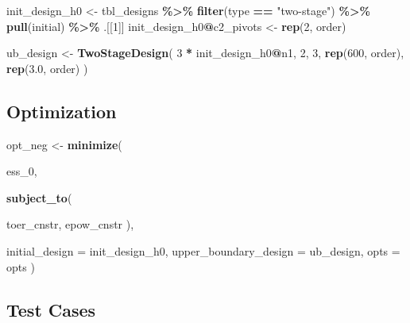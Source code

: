 \documentclass[
]{book}
\newenvironment{Shaded}{\begin{snugshade}}{\end{snugshade}}
\newcommand{\DataTypeTok}[1]{\textcolor[rgb]{0.13,0.29,0.53}{#1}}
\newcommand{\DecValTok}[1]{\textcolor[rgb]{0.00,0.00,0.81}{#1}}
\newcommand{\FloatTok}[1]{\textcolor[rgb]{0.00,0.00,0.81}{#1}}
\newcommand{\KeywordTok}[1]{\textcolor[rgb]{0.13,0.29,0.53}{\textbf{#1}}}
\newcommand{\NormalTok}[1]{#1}
\newcommand{\OperatorTok}[1]{\textcolor[rgb]{0.81,0.36,0.00}{\textbf{#1}}}
\newcommand{\StringTok}[1]{\textcolor[rgb]{0.31,0.60,0.02}{#1}}
\begin{document}
\begin{Shaded}
\begin{Highlighting}[]
\NormalTok{init\_design\_h0 \textless{}{-}}\StringTok{ }\NormalTok{tbl\_designs }\OperatorTok{\%\textgreater{}\%}\StringTok{ }
\StringTok{    }\KeywordTok{filter}\NormalTok{(type }\OperatorTok{==}\StringTok{ "two{-}stage"}\NormalTok{) }\OperatorTok{\%\textgreater{}\%}\StringTok{ }
\StringTok{    }\KeywordTok{pull}\NormalTok{(initial) }\OperatorTok{\%\textgreater{}\%}\StringTok{ }
\StringTok{    }\NormalTok{.[[}\DecValTok{1}\NormalTok{]]}
\NormalTok{init\_design\_h0}\OperatorTok{@}\NormalTok{c2\_pivots \textless{}{-}}\StringTok{ }\KeywordTok{rep}\NormalTok{(}\DecValTok{2}\NormalTok{, order)}

\NormalTok{ub\_design \textless{}{-}}\StringTok{ }\KeywordTok{TwoStageDesign}\NormalTok{(}
    \DecValTok{3} \OperatorTok{*}\StringTok{ }\NormalTok{init\_design\_h0}\OperatorTok{@}\NormalTok{n1,}
    \DecValTok{2}\NormalTok{,}
    \DecValTok{3}\NormalTok{,}
    \KeywordTok{rep}\NormalTok{(}\DecValTok{600}\NormalTok{, order),}
    \KeywordTok{rep}\NormalTok{(}\FloatTok{3.0}\NormalTok{, order)}
\NormalTok{)}
\end{Highlighting}
\end{Shaded}

\hypertarget{optimization-4}{%
\subsection{Optimization}\label{optimization-4}}

\begin{Shaded}
\begin{Highlighting}[]
\NormalTok{opt\_neg \textless{}{-}}\StringTok{ }\KeywordTok{minimize}\NormalTok{(}
  
\NormalTok{        ess\_}\DecValTok{0}\NormalTok{,}
        
        \KeywordTok{subject\_to}\NormalTok{(}
          
\NormalTok{            toer\_cnstr,}
\NormalTok{            epow\_cnstr}
\NormalTok{        ),}
        
        \DataTypeTok{initial\_design =}\NormalTok{ init\_design\_h0,}
        \DataTypeTok{upper\_boundary\_design =}\NormalTok{ ub\_design,}
        \DataTypeTok{opts =}\NormalTok{ opts}
\NormalTok{)}
\end{Highlighting}
\end{Shaded}

\hypertarget{test-cases-4}{%
\subsection{Test Cases}\label{test-cases-4}}
\end{document}
